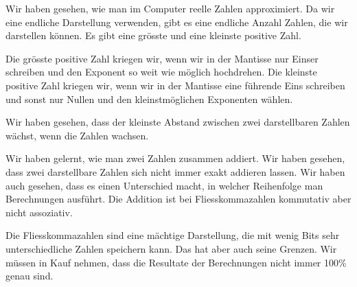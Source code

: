Wir haben gesehen, wie man im Computer reelle Zahlen approximiert. Da wir eine endliche Darstellung verwenden, gibt es eine endliche Anzahl Zahlen, die wir darstellen können. Es gibt eine grösste und eine kleinste positive Zahl.

Die grösste positive Zahl kriegen wir, wenn wir in der Mantisse nur Einser schreiben und den Exponent so weit wie möglich hochdrehen. Die kleinste positive Zahl kriegen wir, wenn wir in der Mantisse eine führende Eins schreiben und sonst nur Nullen und den kleinstmöglichen Exponenten wählen.

Wir haben gesehen, dass der kleinste Abstand zwischen zwei darstellbaren Zahlen wächst, wenn die Zahlen wachsen.

Wir haben gelernt, wie man zwei Zahlen zusammen addiert. Wir haben gesehen, dass zwei darstellbare Zahlen sich nicht immer exakt addieren lassen. Wir haben auch gesehen, dass es einen Unterschied macht, in welcher Reihenfolge man Berechnungen ausführt. Die Addition ist bei Fliesskommazahlen kommutativ aber nicht assoziativ.

Die Fliesskommazahlen sind eine mächtige Darstellung, die mit wenig Bits sehr unterschiedliche Zahlen speichern kann. Das hat aber auch seine Grenzen. Wir müssen in Kauf nehmen, dass die Resultate der Berechnungen nicht immer 100\% genau sind.
